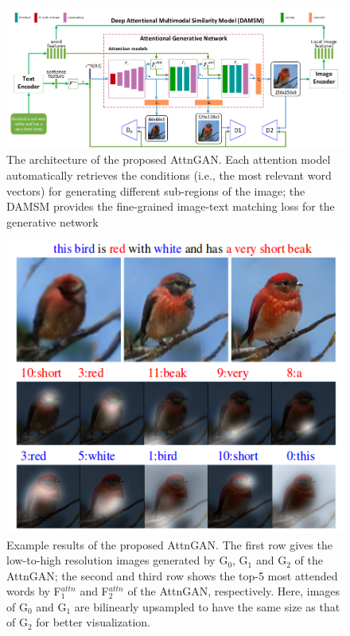 \documentclass[a4paper]{article}
\begin{document}
	\begin{figure}
		\begin{center}
			\includegraphics[scale=0.5]{figures/4.png}
		\end{center}
		\caption{The architecture of the proposed AttnGAN. Each attention model automatically retrieves the conditions (i.e., the most relevant	word vectors) for generating different sub-regions of the image; the DAMSM provides the fine-grained image-text matching loss for the generative network}
		\label{p3}
	\end{figure}
	
	\begin{figure}
		\begin{center}
			\includegraphics[scale=0.5]{figures/5.png}
		\end{center}
		\caption{Example results of the proposed AttnGAN. The first row	gives the low-to-high resolution images generated by G$_0$, G$_1$ and	G$_2$ of the  AttnGAN; the second and third row shows the top-5 most attended words by F$^{attn}_1$ and F$^{attn}_2$ of the AttnGAN, respectively. Here, images of G$_0$ and G$_1$ are bilinearly upsampled to have the same size as that of G$_2$ for better visualization.}
		\label{p4}
	\end{figure}
	
\end{document}
